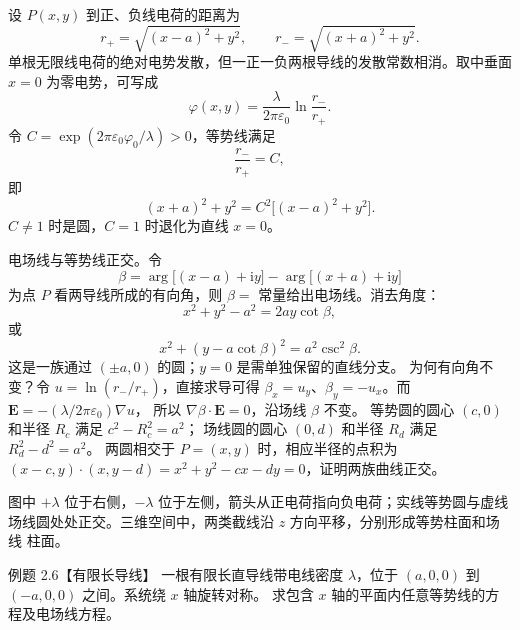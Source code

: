 \begin{xesolution}
设 $P(x,y)$ 到正、负线电荷的距离为
\[
  r_+=\sqrt{(x-a)^2+y^2},\qquad
  r_-=\sqrt{(x+a)^2+y^2}.
\]
单根无限线电荷的绝对电势发散，但一正一负两根导线的发散常数相消。取中垂面 $x=0$ 为零电势，可写成
\[
  \boxed{\varphi(x,y)=\frac{\lambda}{2\pi\varepsilon_0}
  \ln\frac{r_-}{r_+}}.
\]
令 $C=\exp(2\pi\varepsilon_0\varphi_0/\lambda)>0$，等势线满足
\[
  \boxed{\frac{r_-}{r_+}=C},
\]
即
\[
  \boxed{(x+a)^2+y^2=C^2\bigl[(x-a)^2+y^2\bigr]}.
\]
$C\ne1$ 时是圆，$C=1$ 时退化为直线 $x=0$。

电场线与等势线正交。令
\[
  \beta=\arg\bigl[(x-a)+\mathrm i y\bigr]
  -\arg\bigl[(x+a)+\mathrm i y\bigr]
\]
为点 $P$ 看两导线所成的有向角，则 $\beta=$ 常量给出电场线。消去角度：
\[
  \boxed{x^2+y^2-a^2=2ay\cot\beta},
\]
或
\[
  \boxed{x^2+(y-a\cot\beta)^2=a^2\csc^2\beta}.
\]
这是一族通过 $(\pm a,0)$ 的圆；$y=0$ 是需单独保留的直线分支。
为何有向角不变？令 $u=\ln(r_-/r_+)$，直接求导可得
$\beta_x=u_y$、$\beta_y=-u_x$。而 $\boldsymbol E=-(\lambda/2\pi\varepsilon_0)\nabla u$，
所以 $\nabla\beta\cdot\boldsymbol E=0$，沿场线 $\beta$ 不变。
等势圆的圆心 $(c,0)$ 和半径 $R_c$ 满足 $c^2-R_c^2=a^2$；
场线圆的圆心 $(0,d)$ 和半径 $R_d$ 满足 $R_d^2-d^2=a^2$。
两圆相交于 $P=(x,y)$ 时，相应半径的点积为
$ (x-c,y)\cdot(x,y-d)=x^2+y^2-cx-dy=0$，证明两族曲线正交。

\twoLinesFamiliesFigure

图中 $+\lambda$ 位于右侧，$-\lambda$ 位于左侧，箭头从正电荷指向负电荷；实线等势圆与虚线场线圆处处正交。三维空间中，两类截线沿 $z$ 方向平移，分别形成等势柱面和场线
柱面。
\end{xesolution}

\begin{origexamplebox}{例题 2.6【有限长导线】}
一根有限长直导线带电线密度 $\lambda$，位于 $(a,0,0)$ 到 $(-a,0,0)$ 之间。系统绕 $x$ 轴旋转对称。
求包含 $x$ 轴的平面内任意等势线的方程及电场线方程。
\end{origexamplebox}

